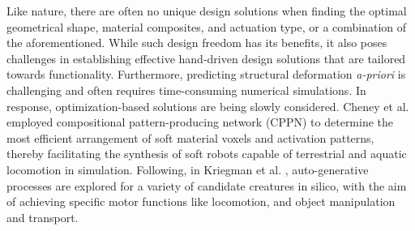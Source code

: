 
Like nature, there are often no unique design solutions when finding the optimal geometrical shape, material composites, and actuation type, or a combination of the aforementioned. While such design freedom has its benefits, it also poses challenges in establishing effective hand-driven design solutions that are tailored towards functionality. Furthermore, predicting structural deformation \textit{a-priori} is challenging and often requires time-consuming numerical simulations. In response, optimization-based solutions are being slowly considered. Cheney et al. \cite{Cheney2013} employed compositional pattern-producing network (CPPN) to determine the most efficient arrangement of soft material voxels and activation patterns, thereby facilitating the synthesis of soft robots capable of terrestrial and aquatic locomotion in simulation. Following, in Kriegman et al. \cite{Kriegman2019,Kriegman2020}, auto-generative processes are explored for a variety of candidate creatures in silico, with the aim of achieving specific motor functions like locomotion, and object manipulation and transport.

